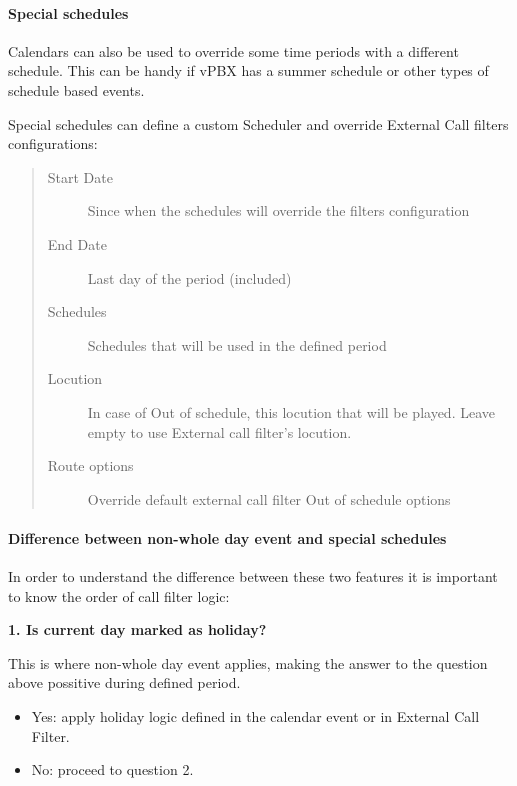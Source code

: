 \documentclass[letterpaper,10pt,english]{sphinxmanual}
\begin{document}
\paragraph{Special schedules}
\label{administration_portal/client/vpbx/routing_tools/calendars:id2}\label{administration_portal/client/vpbx/routing_tools/calendars:special-schedules}
Calendars can also be used to override some time periods with a different schedule.
This can be handy if vPBX has a summer schedule or other types of schedule based events.

Special schedules can define a custom Scheduler and override External Call filters configurations:
\begin{quote}
\begin{description}
\item[{Start Date}] \leavevmode
Since when the schedules will override the filters configuration

\item[{End Date}] \leavevmode
Last day of the period (included)

\item[{Schedules}] \leavevmode
Schedules that will be used in the defined period

\item[{Locution}] \leavevmode
In case of Out of schedule, this locution that will be played. Leave empty to use External
call filter's locution.

\item[{Route options}] \leavevmode
Override default external call filter Out of schedule options

\end{description}
\end{quote}


\paragraph{Difference between non-whole day event and special schedules}
\label{administration_portal/client/vpbx/routing_tools/calendars:difference-between-non-whole-day-event-and-special-schedules}
In order to understand the difference between these two features it is important to know the order of call filter logic:

\textbf{1. Is current day marked as holiday?}

This is where non-whole day event applies, making the answer to the question above possitive during defined period.
\begin{itemize}
\item {} 
Yes: apply holiday logic defined in the calendar event or in External Call Filter.

\item {} 
No: proceed to question 2.

\end{itemize}
\end{document}
